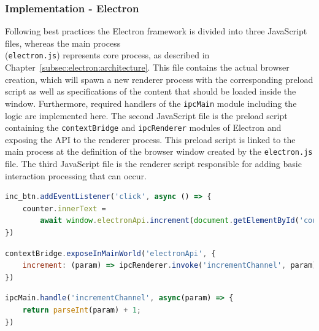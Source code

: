 \subsubsection{Implementation - Electron}
\label{subsubsec:impl:electron}
Following best practices the Electron framework is divided into three JavaScript files, whereas the main process \\(\texttt{electron.js}) represents core process, as described in Chapter~\ref{subsec:electron:architecture}.
This file contains the actual browser creation, which will spawn a new renderer process  with the corresponding preload script as well as specifications of the content that should be loaded inside the window.
Furthermore, required handlers of the \texttt{ipcMain} module including the logic are implemented here.
The second JavaScript file is the preload script containing the \texttt{contextBridge} and \texttt{ipcRenderer} modules of Electron and exposing the \ac{API} to the renderer process.
This preload script is linked to the main process at the definition of the browser window created by the \texttt{electron.js} file.
The third JavaScript file is the renderer script responsible for adding basic interaction processing that can occur.

\begin{lstlisting}[language=JavaScript,label={lst:rendererjs}, caption={Excerpt of render.js}]
inc_btn.addEventListener('click', async () => {
    counter.innerText =
        await window.electronApi.increment(document.getElementById('counter').innerText)
})
\end{lstlisting}
\begin{lstlisting}[language=JavaScript,label={lst:preloadjs}, caption={Excerpt of preload.js}]
contextBridge.exposeInMainWorld('electronApi', {
    increment: (param) => ipcRenderer.invoke('incrementChannel', param)
})
\end{lstlisting}
\begin{lstlisting}[language=JavaScript,label={lst:electronjs}, caption={Excerpt of electron.js}]
ipcMain.handle('incrementChannel', async(param) => {
    return parseInt(param) + 1;
})
\end{lstlisting}


